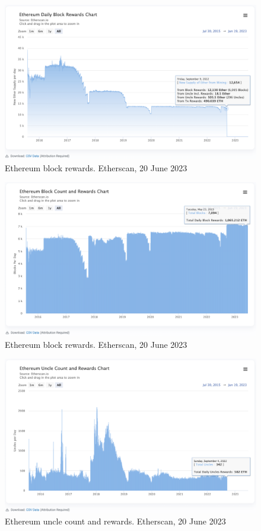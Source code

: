 \documentclass[UTF8]{article}
\begin{document}
{\begin{figure}[htbp]
\begin{center}
\includegraphics[width=0.9\linewidth]{images/ethblkreward}
\caption{Ethereum block rewards. Etherscan, 20 June 2023}
\label{fig:ethblkreward}
\end{center}
\end{figure}

\begin{figure}[htbp]
\begin{center}
\includegraphics[width=0.9\linewidth]{images/ethblkcnt}
\caption{Ethereum block rewards. Etherscan, 20 June 2023}
\label{fig:ethblkcnt}
\end{center}
\end{figure}

\begin{figure}[htbp]
\begin{center}
\includegraphics[width=0.9\linewidth]{images/ethuncle}
\caption{Ethereum uncle count and rewards. Etherscan, 20 June 2023}
\label{fig:ethuncle}
\end{center}
\end{figure}

}
\end{document}
